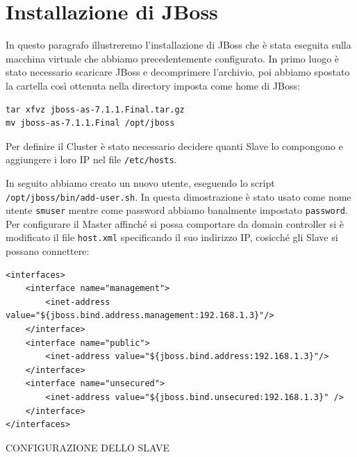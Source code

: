 \documentclass[twoside]{article}
\begin{document}
\section{Installazione di JBoss}
In questo paragrafo illustreremo l'installazione di JBoss \cite{bib:jboss}
che è stata eseguita sulla macchina virtuale che abbiamo precedentemente configurato. 
In primo luogo è stato necessario scaricare JBoss e decomprimere
l'archivio, poi abbiamo spostato la cartella così ottenuta nella directory imposta come
home di JBoss:
\begin{lstlisting}[frame=trBL]
tar xfvz jboss-as-7.1.1.Final.tar.gz
mv jboss-as-7.1.1.Final /opt/jboss
\end{lstlisting}

Per definire il Cluster è stato necessario decidere quanti Slave lo compongono e
aggiungere i loro IP nel file \texttt{/etc/hosts}.

In seguito abbiamo creato un nuovo utente, eseguendo lo script \texttt{/opt/jboss/bin/add-user.sh}.
In questa dimostrazione è stato usato come nome utente \texttt{smuser} mentre come password abbiamo
banalmente impostato \texttt{password}.
Per configurare il Master affinché si possa comportare da domain controller si è modificato il file
\texttt{host.xml} specificando il suo indirizzo IP, cosicché gli Slave si possano connettere:
\begin{lstlisting}[frame=trBL]
<interfaces>
	<interface name="management">
		<inet-address value="${jboss.bind.address.management:192.168.1.3}"/>
	</interface>
	<interface name="public">
		<inet-address value="${jboss.bind.address:192.168.1.3}"/>
	</interface>
	<interface name="unsecured">
		<inet-address value="${jboss.bind.unsecured:192.168.1.3}" />
	</interface>
</interfaces>
\end{lstlisting}

CONFIGURAZIONE DELLO SLAVE
\end{document}

